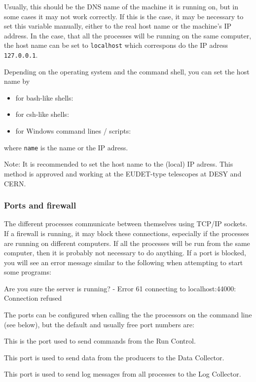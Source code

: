 Usually, this should be the DNS name of the machine it is running on, but in some cases it may not work correctly.
If this is the case, it may be necessary to set this variable manually, either to the real host name
or the machine's IP address. 
In the case, that all the processes will be running on the same computer, the host name can be set to \texttt{localhost} which correspons do the IP adress \texttt{127.0.0.1}.

Depending on the operating system and the command shell, you can set the host name by
\begin{itemize}
\item for bash-like shells: 
\item for csh-like shells: 
\item for Windows command lines / scripts: 
\end{itemize}
where \texttt{name} is the name or the IP adress.

Note: It is recommended to set the host name to the (local) IP adress. 
This method is approved and working at the EUDET-type telescopes at DESY and CERN.


\subsubsection{Ports and firewall}
The different processes communicate between themselves using TCP/IP sockets.
If a firewall is running, it may block these connections,
especially if the processes are running on different computers.
If all the processes will be run from the same computer,
then it is probably not necessary to do anything.
If a port is blocked, you will see an error message similar to the following
when attempting to start some programs:
\begin{listing}[]
Are you sure the server is running? - Error 61 connecting to localhost:44000: Connection refused
\end{listing}

The ports can be configured when calling the the processors on the command line (see below), but the default and usually free port numbers are:
\begin{description}

This is the port used to send commands from the Run Control.

This port is used to send data from the producers to the Data Collector.

This port is used to send log messages from all processes to the Log Collector.

\end{description}

